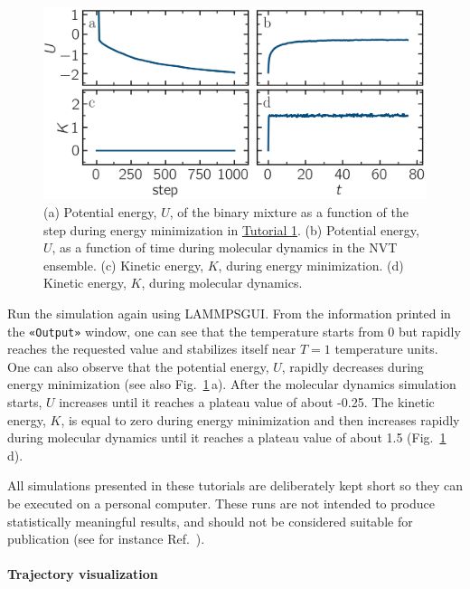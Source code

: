 \documentclass[9pt,tutorial]{livecoms}
\newcommand{\guicmd}[1]{\textcolor{command}{\texttt{«#1»}}} %
\newcommand{\lammpsgui}{\textsf{LAMMPS\textendash GUI}}
\begin{document}
\begin{figure}
\centering
\includegraphics[width=\linewidth]{LJ-energy}
\caption{(a) Potential energy, $U$, of the binary mixture as a function of the
step during energy minimization in \hyperref[lennard-jones-label]{Tutorial 1}.
(b) Potential energy, $U$, as a function of time during molecular dynamics in
the NVT ensemble.  (c) Kinetic energy, $K$, during energy minimization.
(d) Kinetic energy, $K$, during molecular dynamics.}
\label{fig:evolution-energy}
\end{figure}

Run the simulation again using \lammpsgui{}.  From the information
printed in the \guicmd{Output} window, one can see that the temperature
starts from 0 but rapidly reaches the requested value and
stabilizes itself near $T=1$ temperature units.  One can also observe that
the potential energy, $U$, rapidly decreases during energy
minimization (see also Fig.~\ref{fig:evolution-energy}\,a).  After
the molecular dynamics simulation starts, $U$ increases until
it reaches a plateau value of about -0.25.  The kinetic energy,
$K$, is equal to zero during energy minimization and then
increases rapidly during molecular dynamics until it reaches
a plateau value of about 1.5 (Fig.~\ref{fig:evolution-energy}\,d).

\begin{note}
{\color{blue}All simulations presented in these tutorials are deliberately kept
short so they can be executed on a personal computer.  These runs are not intended
to produce statistically meaningful results, and should not be considered suitable
for publication (see for instance Ref.~).}
\end{note}

\paragraph{Trajectory visualization}
\end{document}
